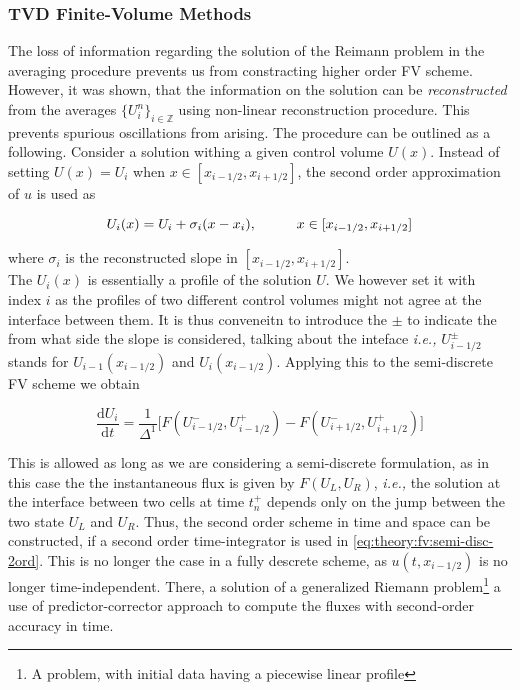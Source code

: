 \documentclass[11pt,a4paper,headinclude=true,DIV=14,BCOR=8mm,chapterprefix,listof=totoc,twoside,openright,abstracton]{scrbook}
\begin{document}
\subsubsection{TVD Finite-Volume Methods}

The loss of information regarding the solution of the Reimann problem in the averaging procedure prevents us from constracting higher order FV scheme. However, it was shown, that the information on the solution can be \textit{reconstructed} from the averages $\{U_i ^n\}_{i\in\mathbb{Z}}$ using non-linear reconstruction procedure. This prevents spurious oscillations from arising. The procedure can be outlined as a following. Consider a solution withing a given control volume $U(x)$. Instead of setting $U(x) = U_i$ when $x\in[x_{i-1/2},x_{i+1/2}]$, the second order approximation of $u$ is used as 

\begin{equation}
    U_i(x) = U_i + \sigma_i(x-x_i), \hspace{10mm}x\in[x_{i-1/2},x_{i+1/2}]
\end{equation}

where $\sigma_i$ is the reconstructed slope in $[x_{i-1/2},x_{i+1/2}]$. \\

The $U_i(x)$ is essentially a profile of the solution $U$. We however set it with index $i$ as the profiles of two different control volumes might not agree at the interface between them. It is thus conveneitn to introduce the $\pm$ to indicate the from what side the slope is considered, talking about the inteface \textit{i.e.,} $U^{\pm} _{i-1/2}$ stands for $U_{i-1}(x_{i-1/2})$ and $U_i(x_{i-1/2})$. Applying this to the semi-discrete FV scheme we obtain 

\begin{equation}
    \frac{\text{d} U_i}{\text{d}t} = \frac{1}{\Delta^1}\big[F(U^{-}_{i-1/2},U^{+}_{i-1/2}) - F(U^{-}_{i+1/2},U^{+}_{i+1/2})\big]
    \label{eq:theory:fv:semi-disc-2ord}
\end{equation}

This is allowed as long as we are considering a semi-discrete formulation, as in this case the the instantaneous flux is given by $F(U_L, U_R)$, \textit{i.e.,} the solution at the interface between two cells at time $t_n ^+$ depends only on the jump between the two state $U_L$ and $U_R$. Thus, the second order scheme in time and space can be constructed, if a second order time-integrator is used in \ref{eq:theory:fv:semi-disc-2ord}. This is no longer the case in a fully descrete scheme, as $u(t, x_{i-1/2})$ is no longer time-independent. There, a solution of a generalized Riemann problem\footnote{A problem, with initial data having a piecewise linear profile} a use of predictor-corrector approach to compute the fluxes with second-order accuracy in time. \\
\end{document}
